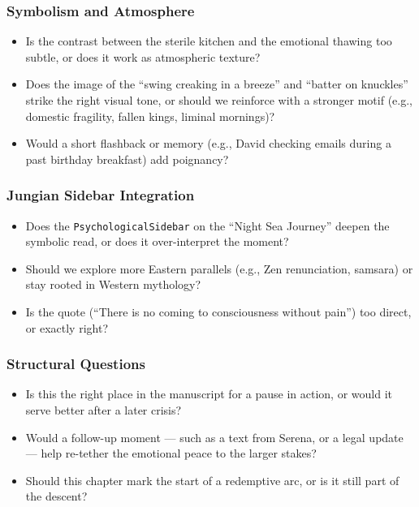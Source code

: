 \subsubsection*{Symbolism and Atmosphere}

\begin{itemize}
  \item Is the contrast between the sterile kitchen and the emotional thawing too subtle, or does it work as atmospheric texture?
  \item Does the image of the ``swing creaking in a breeze'' and ``batter on knuckles'' strike the right visual tone, or should we reinforce with a stronger motif (e.g., domestic fragility, fallen kings, liminal mornings)?
  \item Would a short flashback or memory (e.g., David checking emails during a past birthday breakfast) add poignancy?
\end{itemize}

\subsubsection*{Jungian Sidebar Integration}

\begin{itemize}
  \item Does the \texttt{PsychologicalSidebar} on the ``Night Sea Journey'' deepen the symbolic read, or does it over-interpret the moment?
  \item Should we explore more Eastern parallels (e.g., Zen renunciation, samsara) or stay rooted in Western mythology?
  \item Is the quote (“There is no coming to consciousness without pain”) too direct, or exactly right?
\end{itemize}

\subsubsection*{Structural Questions}

\begin{itemize}
  \item Is this the right place in the manuscript for a pause in action, or would it serve better after a later crisis?
  \item Would a follow-up moment — such as a text from Serena, or a legal update — help re-tether the emotional peace to the larger stakes?
  \item Should this chapter mark the start of a redemptive arc, or is it still part of the descent?
\end{itemize}

